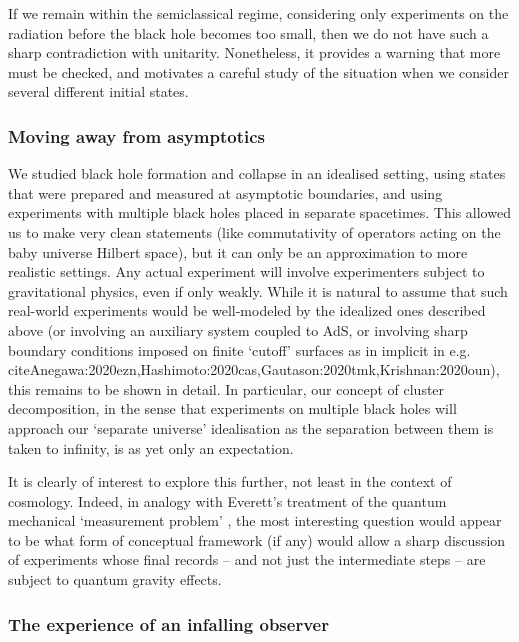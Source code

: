 \documentclass[letterpaper,12pt]{article}
\begin{document}
If we remain within the semiclassical regime, considering only experiments on the radiation before the black hole becomes too small, then we do not have such a sharp contradiction with unitarity. Nonetheless, it provides a warning that more must be checked, and motivates a careful study of the situation when we consider several different initial states.

\subsubsection{Moving away from asymptotics}

We studied black hole formation and collapse in an idealised setting, using states that were prepared and measured at asymptotic boundaries, and using experiments with multiple black holes placed in separate spacetimes. This allowed us to make very clean statements (like commutativity of operators acting on the baby universe Hilbert space), but it can only be an approximation to more realistic settings. Any actual experiment will involve experimenters subject to gravitational physics, even if only weakly.  While it is natural to assume that such real-world experiments would be well-modeled by the idealized ones described above (or involving an auxiliary system coupled to AdS, or involving sharp boundary conditions imposed on finite `cutoff' surfaces as in implicit in e.g.\\cite{Anegawa:2020ezn,Hashimoto:2020cas,Gautason:2020tmk,Krishnan:2020oun}), this remains to be shown in detail. In particular, our concept of cluster decomposition, in the sense that experiments on multiple black holes will approach our `separate universe' idealisation as the separation between them is taken to infinity, is as yet only an expectation.

It is clearly of interest to explore this further, not least in the context of cosmology.  Indeed, in analogy with Everett's treatment of the quantum mechanical `measurement problem' \cite{Everett:1956dja}, the most interesting question would appear to be what form of conceptual framework (if any) would allow a sharp discussion of experiments whose final records -- and not just the intermediate steps -- are subject to quantum gravity effects.


\subsubsection{The experience of an infalling observer}
\end{document}
